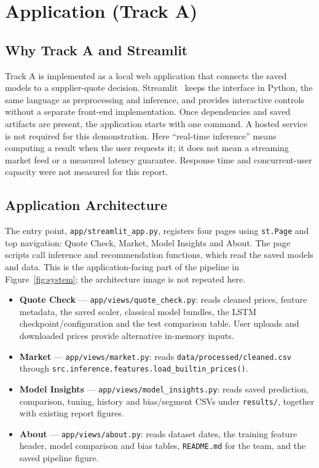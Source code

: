 \section{Application (Track A)}
\label{sec:application}

\subsection{Why Track A and Streamlit}
Track A is implemented as a local web application that connects the saved
models to a supplier-quote decision. Streamlit~\cite{b_streamlit} keeps the
interface in Python, the same language as preprocessing and inference, and
provides interactive controls without a separate front-end implementation.
Once dependencies and saved artifacts are present, the application starts
with one command. A hosted service is not required for this demonstration.
Here ``real-time inference'' means computing a result when the user requests
it; it does not mean a streaming market feed or a measured latency guarantee.
Response time and concurrent-user capacity were not measured for this report.

\subsection{Application Architecture}
The entry point, \texttt{app/streamlit\_app.py}, registers four pages using
\texttt{st.Page} and top navigation: Quote Check, Market, Model Insights and
About. The page scripts call inference and recommendation functions, which
read the saved models and data. This is the application-facing part of the
pipeline in Figure~\ref{fig:system}; the architecture image is not repeated
here.

\begin{itemize}
    \item \textbf{Quote Check} --- \texttt{app/views/quote\_check.py}: reads
    cleaned prices, feature metadata, the saved scaler, classical model
    bundles, the LSTM checkpoint/configuration and the test comparison table.
    User uploads and downloaded prices provide alternative in-memory inputs.
    \item \textbf{Market} --- \texttt{app/views/market.py}: reads
    \texttt{data/processed/cleaned.csv} through
    \texttt{src.\allowbreak inference.\allowbreak features.\allowbreak load\_\allowbreak builtin\_\allowbreak prices()}.
    \item \textbf{Model Insights} --- \texttt{app/views/model\_insights.py}:
    reads saved prediction, comparison, tuning, history and bias/segment CSVs
    under \texttt{results/}, together with existing report figures.
    \item \textbf{About} --- \texttt{app/views/about.py}: reads dataset dates,
    the training feature header, model comparison and bias tables,
    \texttt{README.md} for the team, and the saved pipeline figure.
\end{itemize}

